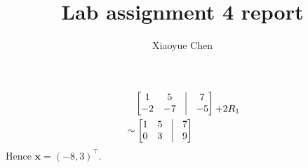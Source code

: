 \documentclass{article}
\title{Lab assignment 4 report}
\author{Xiaoyue Chen}
\begin{document}
\maketitle

\section{}
\begin{align*}
	 & \quad \begin{bmatrix}
		1  & 5  & \vline & 7  \\
		-2 & -7 & \vline & -5
	\end{bmatrix}
	\begin{matrix}
		\\
		+2R_1
	\end{matrix}          \\
	 & \sim
	\begin{bmatrix}
		1 & 5 & \vline & 7 \\
		0 & 3 & \vline & 9
	\end{bmatrix}
\end{align*}
Hence $\boldsymbol{x}=(-8, 3)^\intercal$.
\end{document}
